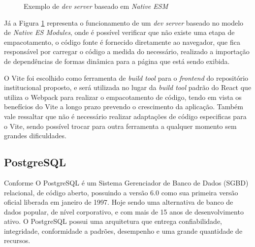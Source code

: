 \begin{figure}[H]
    \caption{Exemplo de \emph{dev server} baseado em \emph{Native ESM}}
    \centering
    \label{fig:esm-based}
\end{figure}

Já a Figura \ref{fig:esm-based} representa o funcionamento de um \emph{dev server}
baseado no modelo de \emph{Native ES Modules}, onde é possível verificar que
não existe uma etapa de empacotamento, o código fonte é fornecido diretamente
ao navegador, que fica responsável por carregar o código a medida do necessário,
realizado a importação de dependências de formas dinâmica para a página que está
sendo exibida.

O Vite foi escolhido como ferramenta de \emph{build tool} para o \emph{frontend}
do repositório institucional proposto, e será utilizada no lugar da \emph{build tool}
padrão do React que utiliza o Webpack para realizar o empacotamento de código,
tendo em vista os benefícios do Vite a longo prazo prevendo o crescimento da aplicação.
Também vale ressaltar que não é necessário realizar adaptações de código especificas
para o Vite, sendo possível trocar para outra ferramenta a qualquer momento sem
grandes dificuldades.

\subsection{PostgreSQL}

Conforme \cite{2017:Carvalho} O PostgreSQL é um Sistema Gerenciador de
Banco de Dados (SGBD) relacional, de código aberto, possuindo a versão 6.0
como sua primeira versão oficial liberada em janeiro de 1997.
Hoje sendo uma alternativa de banco de dados popular, de nível corporativo,
e com mais de 15 anos de desenvolvimento ativo. O PostgreSQL possui uma
arquitetura que entrega confiabilidade, integridade, conformidade a padrões,
desempenho e uma grande quantidade de recursos.

